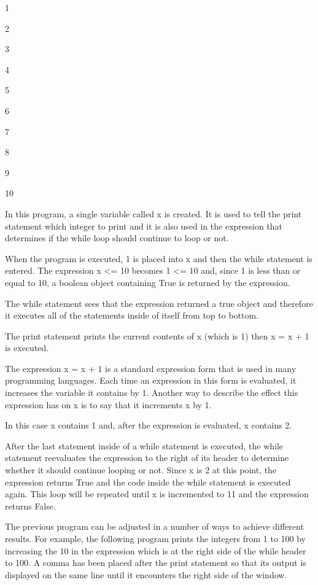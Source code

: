 \documentclass[12pt,oneside]{book}
\begin{document}
{\textbar}

1

2

3

4

5

6

7

8

9

10

In this program, a single variable called x is created. It is used to tell the print statement which integer to print and it is also used in the expression that determines if the while loop should continue to loop or not. 

When the program is executed, 1 is placed into x and then the while statement is entered. The expression x {\textless}= 10 becomes 1 {\textless}= 10 and, since 1 is less than or equal to 10, a boolean object containing True is returned by the expression. 

The while statement sees that the expression returned a true object and therefore it executes all of the statements inside of itself from top to bottom.

The print statement prints the current contents of x (which is 1) then x = x + 1 is executed.

The expression x = x + 1 is a standard expression form that is used in many programming languages. Each time an expression in this form is evaluated, it increases the variable it contains by 1. Another way to describe the effect this expression has on x is to say that it increments x by 1. 

In this case x contains 1 and, after the expression is evaluated, x contains 2.


After the last statement inside of a while statement is executed, the while statement reevaluates the expression to the right of its header to determine whether it should continue looping or not. Since x is 2 at this point, the expression returns True and the code inside the while statement is executed again. This loop will be repeated until x is incremented to 11 and the expression returns False. 

The previous program can be adjusted in a number of ways to achieve different results. For example, the following program prints the integers from 1 to 100 by increasing the 10 in the expression which is at the right side of the while header to 100. A comma has been placed after the print statement so that its output is displayed on the same line until it encounters the right side of the window. 
\end{document}
